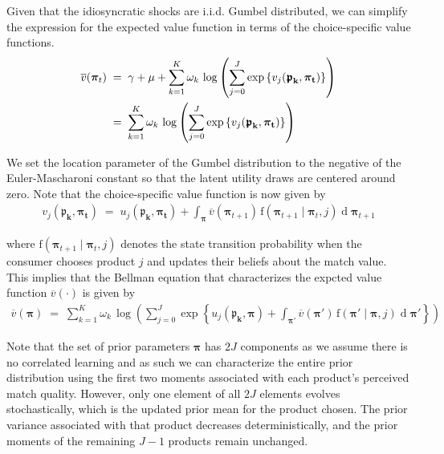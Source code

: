\documentclass[11pt]{article}
\begin{document}
\noindent Given that the idiosyncratic shocks are i.i.d. Gumbel distributed, we can simplify the expression for the expected value function in terms of the choice-specific value functions.
\begin{align}
    \overline{v}(\boldsymbol{\pi}_t) \; & = \; \gamma + \mu + \sum_{k=1}^K \omega_k \, \log  \left( \sum_{j = 0}^J \exp \left\{ v_j(\mathbf{\boldsymbol{\mathfrak{p}}_k, \boldsymbol{\pi}_t}) \right\} \right) \notag \\
    & = \;  \sum_{k=1}^K \omega_k \, \log \left( \sum_{j = 0}^J \exp \left\{ v_j(\mathbf{\boldsymbol{\mathfrak{p}}_k, \boldsymbol{\pi}_t})  \right\} \right) 
\end{align}

\noindent 
We set the location parameter of the Gumbel distribution to the negative of the Euler-Mascharoni constant so that the latent utility draws are centered around zero. Note that the choice-specific value function is now given by
\begin{gather}
v_j(\mathbf{\boldsymbol{\mathfrak{p}}_k, \boldsymbol{\pi}_t}) \; = \; u_j(\mathbf{\boldsymbol{\mathfrak{p}}_k, \boldsymbol{\pi}_t}) + \int_{\boldsymbol{\pi}}\overline{v}(\boldsymbol{\pi}_{t+1}) \, \text{f}\left( \boldsymbol{\pi}_{t+1} \mid \boldsymbol{\pi}_{t}, j\right) \operatorname{d}\boldsymbol{\pi}_{t+1}
\end{gather}

\noindent where $\text{f}\left( \boldsymbol{\pi}_{t+1} \mid \boldsymbol{\pi}_{t}, j\right)$ denotes the state transition probability when the consumer chooses product $j$ and updates their beliefs about the match value. \\

\noindent This implies that the Bellman equation that characterizes the expcted value function $\overline{v}(\cdot)$ is given by 
\begin{gather}
    \overline{v}(\boldsymbol{\pi})  \; = \; \sum_{k=1}^K \omega_k \, \log \left( \sum_{j = 0}^J \exp \left\{  u_j(\mathbf{\boldsymbol{\mathfrak{p}}_k, \boldsymbol{\pi}}) + \int_{\boldsymbol{\pi}'}\overline{v}(\boldsymbol{\pi}') \, \text{f}\left( \boldsymbol{\pi}' \mid \boldsymbol{\pi}, j\right) \operatorname{d}\boldsymbol{\pi}' \right\} \right) \label{eq:BE-evf}
\end{gather}


\noindent Note that the set of prior parameters $\boldsymbol{\pi}$ has $2 J$ components as we assume there is no correlated learning and as such we can characterize the entire prior distribution using the first two moments associated with each product's perceived match quality. However, only one element of all $2J$ elements evolves stochastically, which is the updated prior mean for the product chosen. The prior variance associated with that product decreases deterministically, and the prior moments of the remaining $J -1$ products remain unchanged. \\
\end{document}

